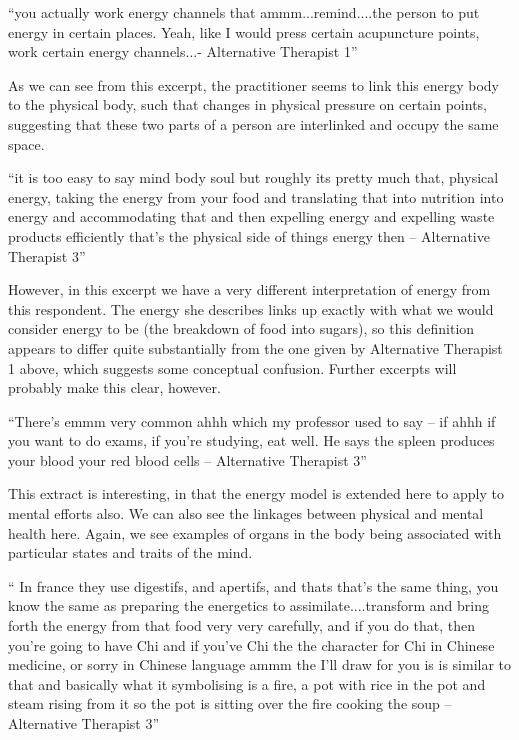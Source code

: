 ``you actually work energy channels that ammm...remind....the person to put energy in certain places. Yeah, like I would press certain acupuncture points, work certain energy channels...- Alternative Therapist 1''

As we can see from this excerpt, the practitioner seems to link this energy body to the physical body, such that changes in physical pressure on certain points, suggesting that these two parts of a person are interlinked and occupy the same space. 

``it is too easy to say mind body soul but roughly its pretty much that, physical energy, taking the energy from your food and translating that into nutrition into energy and accommodating that and then expelling energy and expelling waste products efficiently that's the physical side of things energy then – Alternative Therapist 3''

However, in this excerpt we have a very different interpretation of energy from this respondent. The energy she describes links up exactly with what we would consider energy to be (the breakdown of food into sugars), so this definition appears to differ quite substantially from the one given by Alternative Therapist 1 above, which suggests some conceptual confusion. Further excerpts will probably make this clear, however. 

``There's emmm very common ahhh which my professor used to say – if ahhh if you want to do exams, if you're studying, eat well. He says the spleen produces your blood your red blood cells – Alternative Therapist 3''

This extract is interesting, in that the energy model is extended here to apply to mental efforts also. We can also see the linkages between physical and mental health here. Again, we see examples of organs in the body being associated with particular states and traits of the mind. 

`` In france they use digestifs, and apertifs, and thats that's the same thing, you know the same as preparing the energetics to assimilate....transform and bring forth the energy from that food very very carefully, and if you do that, then you're going to have Chi and if you've Chi the the character for Chi in Chinese medicine, or sorry in Chinese language ammm the I'll draw for you is is similar to that and basically what it symbolising is a fire, a pot with rice in the pot and steam rising from it so the pot is sitting over the fire cooking the soup – Alternative Therapist 3''

